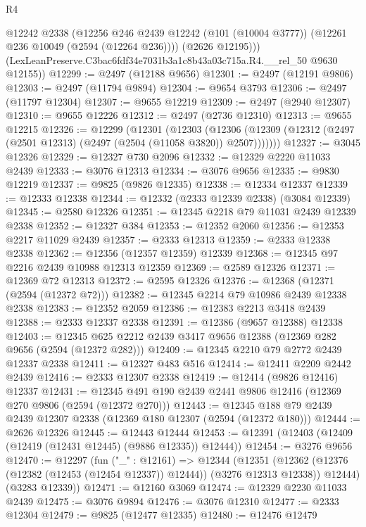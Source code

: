 \begin{lexlean}{R4}
\begin{coremodule}
          @12242
          @2338
          (@12256
            @246
            @2439
            @12242
            (@101 (@10004 @3777))
            (@12261 @236 @10049 (@2594 (@12264 @236))))
          (@2626 @12195)))
      (LexLeanPreserve.C3bac6fdf34e7031b3a1c8b43a03c715a.R4.__rel_50 @9630 @12155))
@12299 := @2497 (@12188 @9656)
@12301 := @2497 (@12191 @9806)
@12303 := @2497 (@11794 @9894)
@12304 := @9654 @3793
@12306 := @2497 (@11797 @12304)
@12307 := @9655 @12219
@12309 := @2497 (@2940 @12307)
@12310 := @9655 @12226
@12312 := @2497 (@2736 @12310)
@12313 := @9655 @12215
@12326 := @12299
    (@12301
      (@12303
        (@12306 (@12309 (@12312 (@2497 (@2501 @12313) (@2497 (@2504 (@11058 @3820)) @2507)))))))
@12327 := @3045 @12326
@12329 := @12327 @730 @2096
@12332 := @12329 @2220 @11033 @2439
@12333 := @3076 @12313
@12334 := @3076 @9656
@12335 := @9830 @12219
@12337 := @9825 (@9826 @12335)
@12338 := @12334 @12337
@12339 := @12333 @12338
@12344 := @12332 (@2333 @12339 @2338) (@3084 @12339)
@12345 := @2580 @12326
@12351 := @12345 @2218 @79 @11031 @2439 @12339 @2338
@12352 := @12327 @384
@12353 := @12352 @2060
@12356 := @12353 @2217 @11029 @2439
@12357 := @2333 @12313
@12359 := @2333 @12338 @2338
@12362 := @12356 (@12357 @12359) @12339
@12368 := @12345 @97 @2216 @2439 @10988 @12313 @12359
@12369 := @2589 @12326
@12371 := @12369 @72 @12313
@12372 := @2595 @12326
@12376 := @12368 (@12371 (@2594 (@12372 @72)))
@12382 := @12345 @2214 @79 @10986 @2439 @12338 @2338
@12383 := @12352 @2059
@12386 := @12383 @2213 @3418 @2439
@12388 := @2333 @12337 @2338
@12391 := @12386 (@9657 @12388) @12338
@12403 := @12345 @625 @2212 @2439 @3417 @9656 @12388 (@12369 @282 @9656 (@2594 (@12372 @282)))
@12409 := @12345 @2210 @79 @2772 @2439 @12337 @2338
@12411 := @12327 @483 @516
@12414 := @12411 @2209 @2442 @2439
@12416 := @2333 @12307 @2338
@12419 := @12414 (@9826 @12416) @12337
@12431 := @12345 @491 @190 @2439 @2441 @9806 @12416 (@12369 @270 @9806 (@2594 (@12372 @270)))
@12443 := @12345 @188 @79 @2439 @2439 @12307 @2338 (@12369 @180 @12307 (@2594 (@12372 @180)))
@12444 := @2626 @12326
@12445 := @12443 @12444
@12453 := @12391 (@12403 (@12409 (@12419 (@12431 @12445) (@9886 @12335)) @12444))
@12454 := @3276 @9656
@12470 := @12297
    (fun ("_" : @12161) =>
    @12344
      (@12351
        (@12362 (@12376 (@12382 (@12453 (@12454 @12337)) @12444)) (@3276 @12313 @12338))
        @12444)
      (@3283 @12339))
@12471 := @12160 @3069
@12474 := @12329 @2230 @11033 @2439
@12475 := @3076 @9894
@12476 := @3076 @12310
@12477 := @2333 @12304
@12479 := @9825 (@12477 @12335)
@12480 := @12476 @12479

\end{coremodule}
\end{lexlean}
